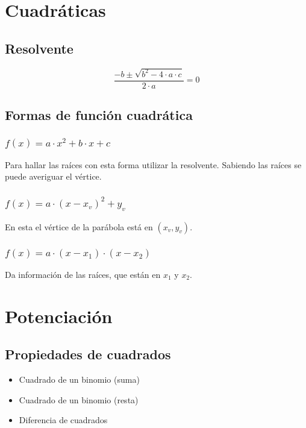 \section{Cuadráticas}


\subsection{Resolvente}


$$\dfrac{-b \pm \sqrt{b^2 - 4\cdot a \cdot c}}{2\cdot a} = 0$$


\subsection{Formas de función cuadrática}


\subsubsection*{
$f(x)=a\cdot x^2 + b \cdot x + c$}

Para hallar las raíces con esta forma utilizar la resolvente. Sabiendo las raíces se puede averiguar el vértice. 

\subsubsection*{
$f(x)= a\cdot(x-x_v)^2 + y_v$}

En esta el vértice de la parábola está en $(x_v, y_v)$.

\subsubsection*{
$f(x)=a\cdot (x-x_1) \cdot (x-x_2)$}

Da información de las raíces, que están en $x_1$ y $x_2$.


\section{Potenciación}

\subsection*{Propiedades de cuadrados}
\begin{itemize}
\item
{}
Cuadrado de un binomio (suma)

\item
{} 
Cuadrado de un binomio (resta)

\item
{} Diferencia de cuadrados
\end{itemize}


